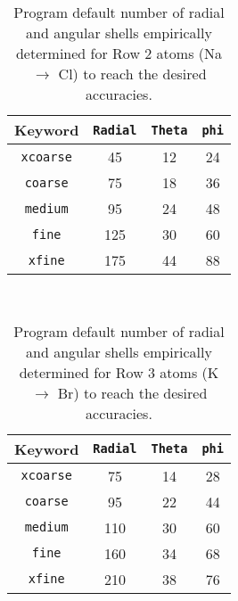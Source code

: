 \begin{table}[h]
\begin{center}
\caption{Program default number of radial and angular shells empirically determined for Row 2 atoms
  (Na $\rightarrow$ Cl) to reach the desired accuracies.}

\vspace{.2in}

  \begin{tabular}[right]{|c|c|c|c|} \hline
Keyword & {\tt Radial} & {\tt Theta} & {\tt phi} \\ \hline
{\tt xcoarse} & 45 & 12 & 24  \\ \hline
{\tt coarse}  & 75 & 18 & 36  \\ \hline
{\tt medium}  & 95 & 24 & 48  \\ \hline
{\tt fine}    &125 & 30 & 60  \\ \hline
{\tt xfine}   &175 & 44 & 88  \\ \hline
  \end{tabular} \\
\end{center}
\end{table}

\begin{table}[h]
\begin{center}
\caption{Program default number of radial and angular shells empirically determined for Row 3 atoms
  (K $\rightarrow$ Br) to reach the desired accuracies.}

\vspace{.2in}

  \begin{tabular}[right]{|c|c|c|c|} \hline
Keyword & {\tt Radial} & {\tt Theta} & {\tt phi} \\ \hline
{\tt xcoarse} & 75 & 14 & 28  \\ \hline
{\tt coarse}  & 95 & 22 & 44  \\ \hline
{\tt medium}  &110 & 30 & 60  \\ \hline
{\tt fine}    &160 & 34 & 68  \\ \hline
{\tt xfine}   &210 & 38 & 76  \\ \hline
  \end{tabular} \\
\end{center}
\end{table}

